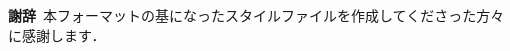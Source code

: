\documentclass[T,J]{fose} %
\begin{document}
\textbf{謝辞}\
本フォーマットの基になったスタイルファイルを作成してくださった方々に感謝します．





\end{document}
